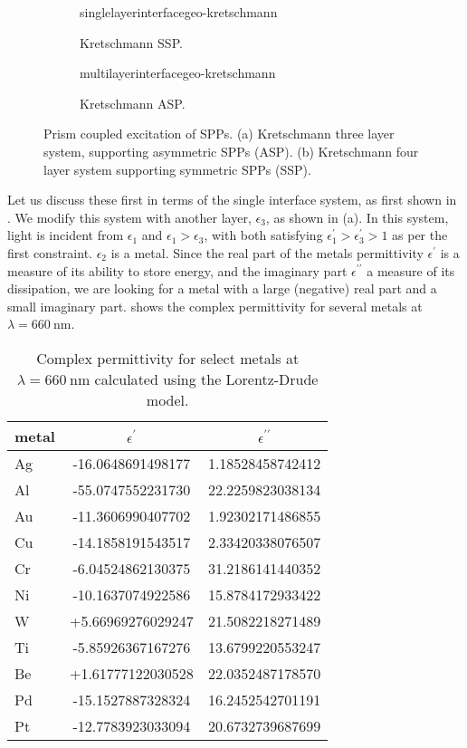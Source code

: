 \begin{figure}[ht]
 \centering
 \begin{subfigure}[b]{0.4\textwidth}
  \centering
  {singlelayerinterfacegeo-kretschmann}
  \caption{Kretschmann SSP.}
 \end{subfigure}
 \begin{subfigure}[b]{0.4\textwidth}
  \centering
  {multilayerinterfacegeo-kretschmann}
  \caption{Kretschmann ASP.}
 \end{subfigure}
\label{fig:prismcoupledsetups}
\caption{Prism coupled excitation of SPPs.  (a) Kretschmann three layer
system, supporting asymmetric SPPs (ASP).  (b) Kretschmann
four layer system supporting symmetric SPPs (SSP). }
\end{figure}
Let us discuss these first in terms of the single interface system, as
first shown in .  We modify this system with
another layer, $\epsilon_3$, as shown in
(a).  In this system, light is incident from
$\epsilon_1$ and $\epsilon_1>\epsilon_3$, with both satisfying
$\epsilon^\prime_1>\epsilon^\prime_3>1$ as per the first constraint.
$\epsilon_2$ is a metal.  Since the real part of the metals permittivity
$\epsilon^\prime$ is a measure of its ability to store energy, and the
imaginary part $\epsilon^{\prime\prime}$ a measure of its dissipation, we
are looking for a metal with a large (negative) real part and a small
imaginary part.   shows the complex permittivity for
several metals at $\lambda=\SI{660}{\nano\meter}$.

\begin{table}[ht]
\centering
{}
\begin{tabular}{lSS}
\toprule
metal & {$\epsilon^\prime$} & {$\epsilon^{\prime\prime}$} \\
\midrule
Ag & -16.0648691498177 & 1.18528458742412\\
Al & -55.0747552231730 & 22.2259823038134\\
Au & -11.3606990407702 & 1.92302171486855\\
Cu & -14.1858191543517 & 2.33420338076507\\
Cr & -6.04524862130375 & 31.2186141440352\\
Ni & -10.1637074922586 & 15.8784172933422\\
W  & +5.66969276029247 & 21.5082218271489\\
Ti & -5.85926367167276 & 13.6799220553247\\
Be & +1.61777122030528 & 22.0352487178570\\
Pd & -15.1527887328324 & 16.2452542701191\\
Pt & -12.7783923033094 & 20.6732739687699\\
\bottomrule
\end{tabular}
\caption{Complex permittivity for select metals at
$\lambda=\SI{660}{\nano\meter}$ calculated using the Lorentz-Drude model.}
\label{tbl:epsmetal600}
\end{table}

